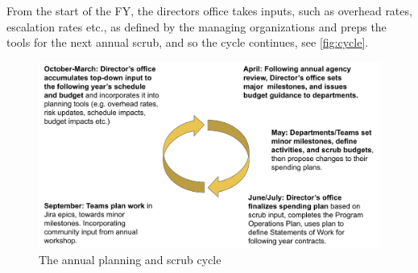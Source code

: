 From the start of the FY, the directors office takes inputs, such as overhead rates, escalation rates etc., as defined by the managing organizations and preps the tools for the next annual scrub, and so the cycle continues, see \autoref{fig:cycle}.


\begin{figure}[h!]
\begin{centering}
\includegraphics[width=1.0\textwidth]{Figure2AnnualPlanningScrubCycle}
	\caption{The annual planning and scrub cycle
\label{fig:cycle}}
\end{centering}
\end{figure}

